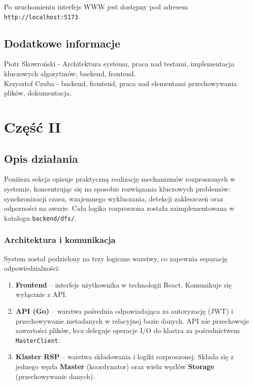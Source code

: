 \documentclass[12pt,a4paper]{article}
\begin{document}
Po uruchomieniu interfejs WWW jest dostępny pod adresem \texttt{http://localhost:5173}.

	\subsection*{Dodatkowe informacje}

    Piotr Skowroński - Architektura systemu, praca nad testami, implementacja kluczowych algorytmów, backend, frontend.\\
    Krzysztof Czuba - backend, frontend, praca nad elementami przechowywania plików, dokumentacja.

	\newpage
	\section{Część II}
\subsection{Opis działania}
	Poniższa sekcja opisuje praktyczną realizację mechanizmów rozproszonych w systemie, koncentrując się na sposobie rozwiązania kluczowych problemów: synchronizacji czasu, wzajemnego wykluczania, detekcji zakleszczeń oraz odporności na awarie. Cała logika rozproszona została zaimplementowana w katalogu \texttt{backend/dfs/}.

	\subsubsection*{Architektura i komunikacja}
	System został podzielony na trzy logiczne warstwy, co zapewnia separację odpowiedzialności:
	
	\begin{enumerate}
		\item \textbf{Frontend} – interfejs użytkownika w technologii React. Komunikuje się wyłącznie z API.
		\item \textbf{API (Go)} – warstwa pośrednia odpowiadająca za autoryzację (JWT) i przechowywanie metadanych w relacyjnej bazie danych. API nie przechowuje zawartości plików, lecz deleguje operacje I/O do klastra za pośrednictwem \texttt{MasterClient}.
		\item \textbf{Klaster RSP} – warstwa składowania i logiki rozproszonej. Składa się z jednego węzła \textbf{Master} (koordynator) oraz wielu węzłów \textbf{Storage} (przechowywanie danych).
	\end{enumerate}
\end{document}
